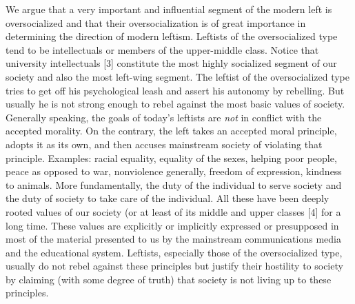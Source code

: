  We argue that a very important and influential segment of the modern left is oversocialized and that their oversocialization is of great importance in determining the direction of modern leftism. Leftists of the oversocialized type tend to be intellectuals or members of the upper-middle class. Notice that university intellectuals [3] constitute the most highly socialized segment of our society and also the most left-wing segment.
 The leftist of the oversocialized type tries to get off his psychological leash and assert his autonomy by rebelling. But usually he is not strong enough to rebel against the most basic values of society. Generally speaking, the goals of today’s leftists are {\em not} in conflict with the accepted morality. On the contrary, the left takes an accepted moral principle, adopts it as its own, and then accuses mainstream society of violating that principle. Examples: racial equality, equality of the sexes, helping poor people, peace as opposed to war, nonviolence generally, freedom of expression, kindness to animals. More fundamentally, the duty of the individual to serve society and the duty of society to take care of the individual. All these have been deeply rooted values of our society (or at least of its middle and upper classes [4] for a long time. These values are explicitly or implicitly expressed or presupposed in most of the material presented to us by the mainstream communications media and the educational system. Leftists, especially those of the oversocialized type, usually do not rebel against these principles but justify their hostility to society by claiming (with some degree of truth) that society is not living up to these principles.
